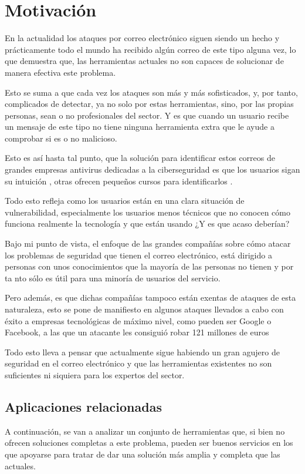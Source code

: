 \chapter{Motivación}
En la actualidad los ataques por correo electrónico siguen siendo un hecho y prácticamente todo el mundo ha recibido algún correo de este tipo alguna vez, lo que demuestra que, las herramientas actuales no son capaces de solucionar de manera efectiva este problema. 

Esto se suma a que cada vez los ataques son más y más sofisticados, y, por tanto, complicados de detectar, ya no solo por estas herramientas, sino, por las propias personas, sean o no profesionales del sector. Y es que cuando un usuario recibe un mensaje de este tipo no tiene ninguna herramienta extra que le ayude a comprobar si es o no malicioso. 

Esto es así hasta tal punto, que la solución para identificar estos correos de grandes empresas antivirus dedicadas a la ciberseguridad es que los usuarios sigan su intuición \cite{What_is_phishing}, otras ofrecen pequeños cursos para identificarlos \cite{Google_juego}.

Todo esto refleja como los usuarios están en una clara situación de vulnerabilidad, especialmente los usuarios menos técnicos que no conocen cómo funciona realmente la tecnología y que están usando ¿Y es que acaso deberían?

Bajo mi punto de vista, el enfoque de las grandes compañías sobre cómo atacar los problemas de seguridad que tienen el correo electrónico, está dirigido a personas con unos conocimientos que la mayoría de las personas no tienen y por ta nto sólo es útil para una minoría de usuarios del servicio. 

Pero además, es que dichas compañías tampoco están exentas de ataques de esta naturaleza, esto se pone de manifiesto en algunos ataques llevados a cabo con éxito a empresas tecnológicas de máximo nivel, como pueden ser Google o Facebook, a las que un atacante les consiguió robar 121 millones de euros \cite{estafa_google_facebook}

Todo esto lleva a pensar que actualmente sigue habiendo un gran agujero de seguridad en el correo electrónico y que las herramientas existentes no son suficientes ni siquiera para los expertos del sector. 


\section{Aplicaciones relacionadas}
A continuación, se van a analizar un conjunto de herramientas que, si bien no ofrecen soluciones completas a este problema, pueden ser buenos servicios en los que apoyarse para tratar de dar una solución más amplia y completa que las actuales.
